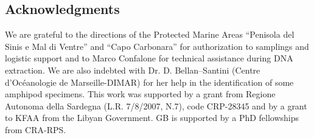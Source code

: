 \subsection{Acknowledgments}
We are grateful to the directions of the Protected Marine Areas ``Penisola del Sinis e Mal di Ventre'' and ``Capo Carbonara'' for authorization to samplings and logistic support and to Marco Confalone for technical assistance during DNA extraction. We are also indebted with Dr. D. Bellan--Santini (Centre d'Oc\'{e}anologie de Marseille-DIMAR) for her help in the identification of some amphipod specimens. This work was supported by a grant from Regione Autonoma della Sardegna (L.R. 7/8/2007, N.7), code CRP-28345 and by a grant to KFAA from the Libyan Government. GB is supported by a PhD fellowships from CRA-RPS.\\

\backmatter
{}
\renewcommand{\sectionmark}[1]{\markright{#1}}
\sectionmark{Bibliography}
